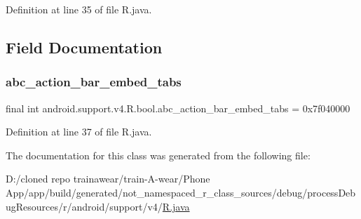Definition at line 35 of file R.\+java.


\begin{DoxyCode}{0}

\end{DoxyCode}


\subsection{Field Documentation}
\mbox{\label{classandroid_1_1support_1_1v4_1_1_r_1_1bool_ae48329695247e01d9540cb1c14ff19b0}} 
\subsubsection{\texorpdfstring{abc\_action\_bar\_embed\_tabs}{abc\_action\_bar\_embed\_tabs}}
{\footnotesize\ttfamily final int android.\+support.\+v4.\+R.\+bool.\+abc\+\_\+action\+\_\+bar\+\_\+embed\+\_\+tabs = 0x7f040000\hspace{0.3cm}{\ttfamily [static]}}



Definition at line 37 of file R.\+java.



The documentation for this class was generated from the following file\+:\begin{DoxyCompactItemize}
\item 
D\+:/cloned repo trainawear/train-\/\+A-\/wear/\+Phone App/app/build/generated/not\+\_\+namespaced\+\_\+r\+\_\+class\+\_\+sources/debug/process\+Debug\+Resources/r/android/support/v4/\mbox{\hyperlink{process_debug_resources_2r_2android_2support_2v4_2_r_8java}{R.\+java}}\end{DoxyCompactItemize}
